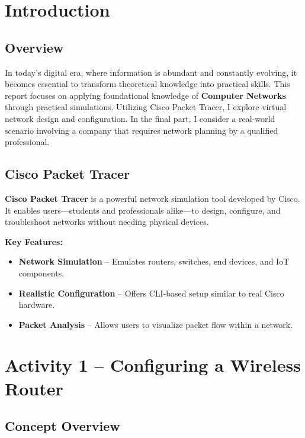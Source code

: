 \documentclass[11pt,a4paper]{article}
\begin{document}
\tableofcontents
\newpage

\setcounter{section}{-1}
\section{Introduction}

\subsection{Overview}

In today's digital era, where information is abundant and constantly evolving, it becomes essential to transform theoretical knowledge into practical skills. This report focuses on applying foundational knowledge of \textbf{Computer Networks} through practical simulations. Utilizing Cisco Packet Tracer, I explore virtual network design and configuration. In the final part, I consider a real-world scenario involving a company that requires network planning by a qualified professional.

\subsection{Cisco Packet Tracer}

\textbf{Cisco Packet Tracer} is a powerful network simulation tool developed by Cisco. It enables users—students and professionals alike—to design, configure, and troubleshoot networks without needing physical devices.

\textbf{Key Features:}
\begin{itemize}[leftmargin=1.5em]
    \item \textbf{Network Simulation} – Emulates routers, switches, end devices, and IoT components.
    \item \textbf{Realistic Configuration} – Offers CLI-based setup similar to real Cisco hardware.
    \item \textbf{Packet Analysis} – Allows users to visualize packet flow within a network.
\end{itemize}

\section{Activity 1 – Configuring a Wireless Router}

\subsection{Concept Overview}
\end{document}
